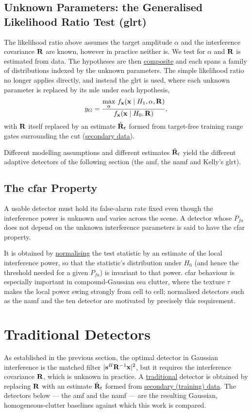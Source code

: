 \documentclass{article}
\begin{document}
\subsection{Unknown Parameters: the Generalised Likelihood Ratio Test (\acrshort{glrt})}
The likelihood ratio above assumes the target amplitude $\alpha$ and the interference covariance $\vb R$ are known, however in practice neither is. We test for $\alpha$ and $\mathbf{R}$ is estimated from data. The hypotheses are then \underline{composite} and each spans a family of distributions indexed by the unknown parameters. The simple likelihood ratio no longer applies directly, and instead the \gls{glrt} is used, where each unknown parameter is replaced by its \gls{mle} under each hypothesis,
$$y_{G} = \frac{\displaystyle\max_{\alpha}\,
                 f_{\vb x}(\vb x\mid H_1,\alpha,\vb R)}
                {f_{\vb x}(\vb x\mid H_0,\vb R)},$$
with $\vb R$ itself replaced by an estimate $\hat{\vb R}_t$ formed from target-free training range gates surrounding the \gls{cut} (\underline{secondary data}). 

Different modelling assumptions and different estimates $\hat{\vb R}_t$ yield the different adaptive detectors of the following section (the \gls{amf}, the \gls{namf} and Kelly's \gls{glrt}).

\subsection{The \acrshort{cfar} Property}
A usable detector must hold its false-alarm rate fixed even though the interference power is unknown and varies across the scene. A detector whose $P_{fa}$ does not depend on the unknown interference parameters is said to have the \gls{cfar} property. 

It is obtained by \underline{normalising} the test statistic by an estimate of the local interference power, so that the statistic's distribution under $H_0$ (and hence the threshold needed for a given $P_{fa}$) is invariant to that power. \gls{cfar} behaviour is especially important in compound-Gaussian sea clutter, where the texture $\tau$ makes the local power swing strongly from cell to cell; normalised detectors such as the \gls{namf} and the \gls{ten} detector are motivated by precisely this requirement.

\newpage
\section{Traditional Detectors}
As established in the previous section, the optimal detector in Gaussian interference is the matched filter $|\vb s^H\vb R^{-1}\vb x|^2$, but it requires the interference covariance $\vb R$, which is unknown in practice. A \underline{traditional} detector is obtained by replacing $\vb R$ with an estimate $\hat{\vb R}_t$ formed from \underline{secondary (training) data}. The detectors below --- the \gls{amf} and the \gls{namf} --- are the resulting Gaussian, homogeneous-clutter baselines against which this work is compared.
\end{document}
